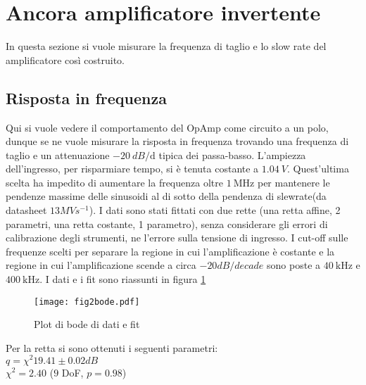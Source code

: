 \section{Ancora amplificatore invertente}
In questa sezione si vuole misurare la frequenza di taglio e lo slow rate del amplificatore così costruito.
\subsection{Risposta in frequenza}
Qui si vuole vedere il comportamento del OpAmp come circuito a un polo, dunque se ne vuole misurare la risposta in frequenza trovando una frequenza di taglio e un attenuazione $\SI{-20}{dB/\deca}$ tipica dei passa-basso.
L'ampiezza dell'ingresso, per risparmiare tempo, si è tenuta costante a $\SI{1.04}{V}$. Quest'ultima scelta ha impedito di aumentare la frequenza oltre $\SI{1}{\MHz}$ per mantenere le pendenze massime delle sinusoidi al di sotto della pendenza di slewrate(da datasheet $13 MVs^{-1}$).%
I dati sono stati fittati con due rette (una retta affine, 2 parametri, una retta costante, 1 parametro), senza considerare gli errori di calibrazione degli strumenti, ne l'errore sulla tensione di ingresso. I cut-off sulle frequenze scelti per separare la regione in cui l'amplificazione è costante e la regione in cui l'amplificazione scende a circa $-20dB/decade$ sono poste a $\SI{40}{\kHz}$ e $\SI{400}{\kHz}$. I dati e i fit sono riassunti in figura \ref{f:BODE2}

\begin{figure}[h]
	\centering
	\texttt{[image: fig2bode.pdf]}
	\caption{Plot di bode di dati e fit}
	\label{f:BODE2}
\end{figure}

Per la retta si sono ottenuti i seguenti parametri:\\
$q =\chi^2{19.41 \pm 0.02}{dB}$\\
$\chi^2 = 2.40$ ($9$ DoF, $p = 0.98$)\\

